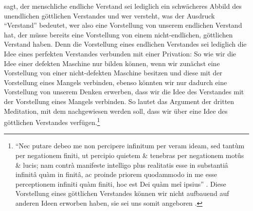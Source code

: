  sagt, der menschliche endliche Verstand sei
lediglich ein schwächeres Abbild des unendlichen göttlichen Verstandes und wer versteht,
was der Ausdruck \enquote{Verstand} bedeutet, wer also eine Vorstellung von
unserem endlichen Verstand hat, der müsse bereits eine Vorstellung von einem
nicht-endlichen, göttlichen Verstand haben. Denn die Vorstellung eines endlichen
Verstandes sei lediglich die Idee eines perfekten Verstandes verbunden mit einer
Privation: So wie wir die Idee einer defekten Maschine nur bilden können, wenn
wir zunächst eine Vorstellung von einer nicht-defekten Maschine besitzen und
diese mit der Vorstellung eines Mangels verbinden, ebenso könnten wir nur
dadurch eine Vorstellung von unserem Denken erwerben, dass wir die Idee des
Verstandes mit der Vorstellung eines Mangels verbinden. So lautet das Argument
der dritten Meditation, mit dem nachgewiesen werden soll, dass wir über eine
Idee des göttlichen Verstandes verfügen.\footnote{\enquote{Nec putare debeo me
non percipere infinitum per veram ideam, sed tant{\`u}m per negationem finiti,
ut percipio quietem {\&} tenebras per negationem mot{\^u}s {\&} lucis; nam
contr{\`a} manifeste intelligo plus realitatis esse in substanti{\^a}
infinit{\^a} qu{\`a}m in finit{\^a}, ac proinde priorem quodammodo in me esse
perceptionem infiniti qu{\`a}m finiti, hoc est Dei qu{\`a}m me{\^i} ipsius}
\parencite[][VII: 45.23--29]{Descartes:OeuvresdeDescartes1983}. Diese
Vorstellung eines göttlichen Verstandes können wir nicht aufbauend auf anderen
Ideen erworben haben, sie sei uns somit angeboren \parencite[vgl.][VII:
51.6--14]{Descartes:OeuvresdeDescartes1983}.}

